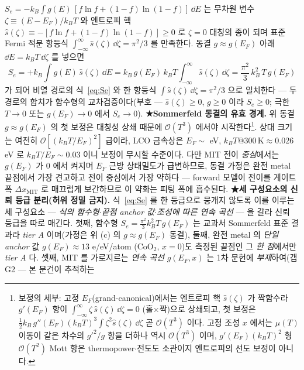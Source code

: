 $S_e=-k_B\int g(E)\,[f\ln f+(1-f)\ln(1-f)]\,\dd E$ 는 무차원 변수 $\zeta\equiv(E-E_F)/k_BT$ 와 엔트로피 핵
$\hat s(\zeta)\equiv-[f\ln f+(1-f)\ln(1-f)]\ge0$ 로 $\zeta=0$ 대칭의 종이 되며 표준 Fermi 적분 항등식
$\int_{-\infty}^{\infty}\hat s(\zeta)\,\dd\zeta=\pi^2/3$ 를 만족한다. 동결 $g\approx g(E_F)$ 아래 $\dd E=k_BT\,\dd\zeta$
를 넣으면
\begin{equation}
S_e=+k_B\int g(E)\,\hat s(\zeta)\,\dd E
=k_B\,g(E_F)\,k_BT\!\int_{-\infty}^{\infty}\!\hat s(\zeta)\,\dd\zeta
=\frac{\pi^2}{3}\,k_B^2\,T\,g(E_F)
\label{eq:Sedirect}
\end{equation}
가 되어 비열 경로의 식~\eqref{eq:Se} 와 한 항등식 $\int \hat s(\zeta)\,\dd\zeta=\pi^2/3$ 으로 일치한다 --- 두 경로의
합치가 함수형의 교차검증이다(부호 --- $\hat s(\zeta)\ge0$, $g\ge0$ 이라 $S_e\ge0$; 극한 $T\to0$ 또는 $g(E_F)\to0$ 에서
$S_e\to0$).
\textbf{★Sommerfeld 동결의 유효 경계.} 위 동결 $g\approx g(E_F)$ 의 첫 보정은 대칭성 상쇄 때문에
$\mathcal O(T^3)$ 에서야 시작한다\footnote{보정의 세부: 고정 $E_F$(grand-canonical)에서는 엔트로피 핵
$\hat s(\zeta)$ 가 짝함수라 $g'(E_F)$ 항이 $\int_{-\infty}^{\infty}\!\zeta\,\hat s(\zeta)\,\dd\zeta=0$
(홀$\times$짝)으로 상쇄되고, 첫 보정은 $\tfrac12 k_B\,g''(E_F)(k_BT)^3\!\int\zeta^2 \hat s(\zeta)\,\dd\zeta$
곧 $\mathcal O(T^3)$ 이다. 고정 조성 $x$ 에서는 $\mu(T)$ 이동이 같은 차수의 $g'^2/g$ 항을 더하나 역시
$\mathcal O(T^3)$ 이며, $g'(E_F)(k_BT)^2$ 형 $\mathcal O(T^2)$ Mott 항은 thermopower$\cdot$전도도
소관이지 엔트로피의 선도 보정이 아니다.}. 상대 크기는 여전히 $\mathcal O[(k_BT/E_F)^2]$ 급이라,
LCO 금속상은 $E_F\sim$ eV, $k_BT@300\,\mathrm K\approx0.026$ eV 로 $k_BT/E_F\sim0.03$ 이니 보정이 무시할 수준이다. 다만 MIT 전이 \emph{중심}에서는 $g(E_F)$
가 0 에서 켜지며 $E_F$ 근방 상태밀도가 급변하므로, 동결 가정은 완전 metal 끝점에서 가장 견고하고 전이 중심에서
가장 약하다 --- forward 모델이 전이를 게이트 폭 $\Delta x_\mathrm{MIT}$ 로 매끄럽게 보간하므로 이 약화는 피팅 폭에
흡수된다. \textbf{★세 구성요소의 신뢰 등급 분리(허위 정밀 금지).}
식~\eqref{eq:Se} 를 한 등급으로 뭉개지 않도록 이를 이루는 세 구성요소 --- \emph{식의 함수형}$\cdot$\emph{끝점
anchor 값}$\cdot$\emph{조성에 따른 연속 곡선} --- 을 갈라 신뢰 등급을 따로 매긴다. 첫째, 함수형
$S_e=\tfrac{\pi^2}{3}k_B^2T\,g(E_F)$ 는 교과서 Sommerfeld 표준 결과라 \emph{tier A} 이며(가정은 위 (c) 의
$g\!\approx\!g(E_F)$ 동결), 둘째, 완전 metal 의 \emph{단일 anchor} 값 $g(E_F)\!\approx\!13$ e/eV/atom
($\mathrm{CoO_2}$, $x{=}0$)도 측정된 끝점인 그 \emph{한 점}에서만 \emph{tier A} 다\cite{motohashi2009}. 셋째,
MIT 를 가로지르는 \emph{연속 곡선} $g(E_F,x)$ 는 1차 문헌에 \emph{부재}하여(갭 G2 --- 본 문건이 추적하는

